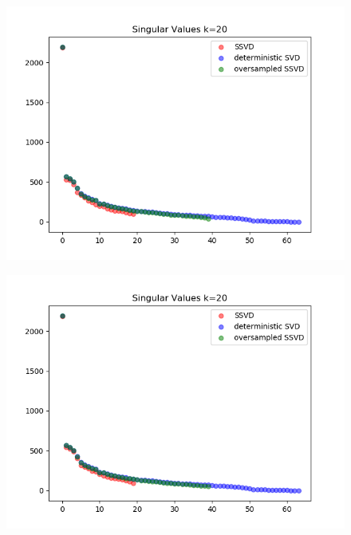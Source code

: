 \documentclass[paper=a4, fontsize=11pt]{scrartcl} %
\numberwithin{figure}{section} %
\numberwithin{table}{section} %
\begin{document}
\begin{figure}[H]

\includegraphics{sing_values_1.png}
\end{figure}

\begin{figure}[H]

\includegraphics{sing_values_2.png}
\end{figure}
\end{document}
